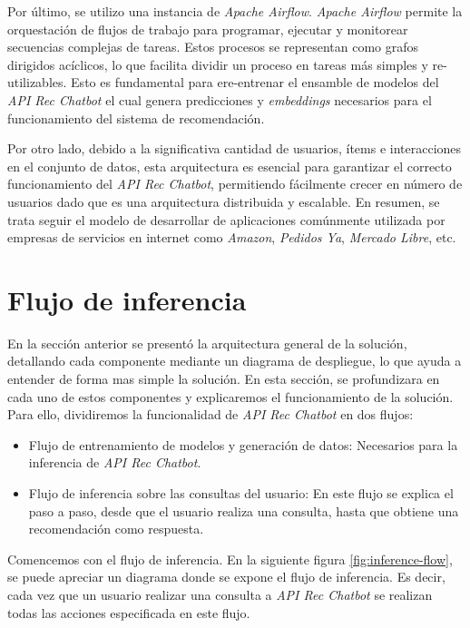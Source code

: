 \documentclass[11pt,a4paper,twoside]{thesis}
\begin{document}
Por último, se utilizo una instancia de \textit{Apache Airflow}. \textit{Apache Airflow} permite la orquestación de flujos de trabajo para programar, ejecutar y monitorear secuencias complejas de tareas. Estos procesos se representan como grafos dirigidos acíclicos, lo que facilita dividir un proceso en tareas más simples y re-utilizables. Esto es fundamental para ere-entrenar el ensamble de modelos del \textit{API Rec Chatbot} el cual genera predicciones y \textit{embeddings} necesarios para el funcionamiento del sistema de recomendación.

Por otro lado, debido a la significativa cantidad de usuarios, ítems e interacciones en el conjunto de datos, esta arquitectura es esencial para garantizar el correcto funcionamiento del \textit{API Rec Chatbot}, permitiendo fácilmente crecer en número de usuarios dado que es una arquitectura distribuida y escalable. En resumen, se trata seguir el modelo de desarrollar de aplicaciones comúnmente utilizada por empresas de servicios en internet como \textit{Amazon}, \textit{Pedidos Ya}, \textit{Mercado Libre}, etc.

\chapter{Flujo de inferencia}

En la sección anterior se presentó la arquitectura general de la solución, detallando cada componente mediante un diagrama de despliegue, lo que ayuda a entender de forma mas simple la solución. En esta sección, se profundizara en cada uno de estos componentes y explicaremos el funcionamiento de la solución. Para ello, dividiremos la funcionalidad de \textit{API Rec Chatbot} en dos flujos:

\begin{itemize}
	\setlength{\itemsep}{0pt}
	\setlength{\parskip}{0pt}

	\item Flujo de entrenamiento de modelos y generación de datos: Necesarios para la inferencia de \textit{API Rec Chatbot}.
	\item Flujo de inferencia sobre las consultas del usuario: En este flujo se explica el paso a paso, desde que el usuario realiza una consulta, hasta que obtiene una recomendación como respuesta.
\end{itemize}

Comencemos con el flujo de inferencia. En la siguiente figura \ref{fig:inference-flow}, se puede apreciar un diagrama donde se expone el flujo de inferencia. Es decir, cada vez que un usuario realizar una consulta a \textit{API Rec Chatbot} se realizan todas las acciones especificada en este flujo.
\vfill
\end{document}

